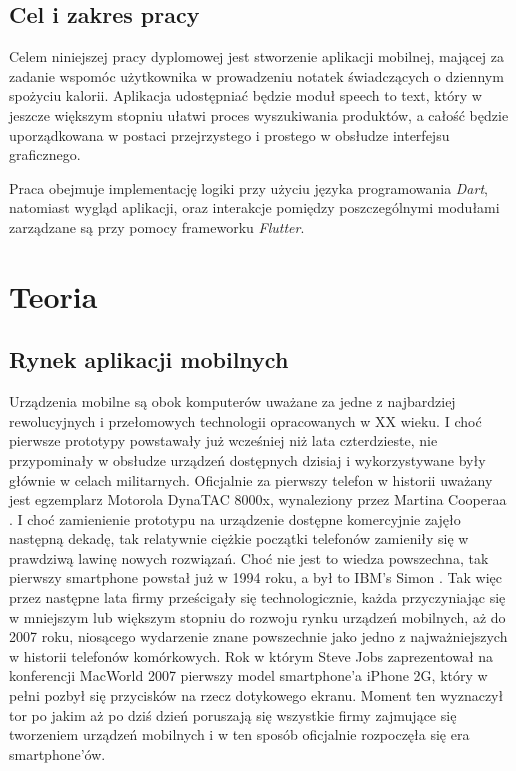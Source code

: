 \documentclass[12pt, a4paper]{article}
\begin{document}
\begin{sloppypar}
{  \subsection{Cel i zakres pracy}
  {
    Celem niniejszej pracy dyplomowej jest stworzenie aplikacji mobilnej, mającej 
    za zadanie wspomóc użytkownika w prowadzeniu notatek świadczących o dziennym
    spożyciu kalorii. Aplikacja udostępniać będzie moduł speech to text,
    który w jeszcze większym stopniu ułatwi proces wyszukiwania produktów, a całość
    będzie uporządkowana w postaci przejrzystego i prostego w obsłudze interfejsu
    graficznego.

    Praca obejmuje implementację logiki przy użyciu języka programowania \emph{Dart},
    natomiast wygląd aplikacji, oraz interakcje pomiędzy poszczególnymi modułami
    zarządzane są przy pomocy frameworku \emph{Flutter}.
  }

}

\section{Teoria}
{
  \subsection{Rynek aplikacji mobilnych}
  {
    Urządzenia mobilne są obok komputerów uważane za jedne z najbardziej rewolucyjnych
    i przełomowych technologii opracowanych w XX wieku. I choć pierwsze prototypy 
    powstawały już wcześniej niż lata czterdzieste, nie przypominały w obsłudze urządzeń
    dostępnych dzisiaj i wykorzystywane były głównie w celach militarnych.
    Oficjalnie za pierwszy telefon w historii uważany jest egzemplarz Motorola 
    DynaTAC 8000x, wynaleziony przez Martina Cooperaa \cite{history1}. I choć
    zamienienie prototypu na urządzenie dostępne
    komercyjnie zajęło następną dekadę, tak relatywnie ciężkie początki telefonów
    zamieniły się w prawdziwą lawinę nowych rozwiązań. Choć nie jest to wiedza
    powszechna, tak pierwszy smartphone powstał już w 1994 roku, a był to IBM's Simon
    \cite{history2}. Tak więc przez następne lata firmy prześcigały się technologicznie,
    każda przyczyniając się w mniejszym lub większym stopniu do rozwoju rynku urządzeń
    mobilnych, aż do 2007 roku, niosącego wydarzenie znane powszechnie jako jedno 
    z najważniejszych w historii telefonów komórkowych. Rok w którym Steve Jobs 
    zaprezentował na konferencji MacWorld 2007 pierwszy model smartphone'a iPhone 2G,
    który w pełni pozbył się przycisków na rzecz dotykowego ekranu. Moment ten wyznaczył
    tor po jakim aż po dziś dzień poruszają się wszystkie firmy zajmujące się tworzeniem
    urządzeń mobilnych i w ten sposób oficjalnie rozpoczęła się era smartphone'ów.

}}
\end{sloppypar}
\end{document}
